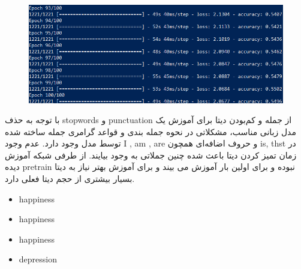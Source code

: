 \documentclass[10pt]{article}
\begin{document}
	\begin{figure}[ht!]
		\centering\includegraphics[width=0.9\linewidth]{../reports/lm_hap.png}
		\caption{
			}
		\label{lm_hap}
	\end{figure}

با توجه به حذف stopwords و punctuation از جمله و کم‌بودن دیتا برای آموزش یک مدل زبانی مناسب، مشکلاتی در نحوه جمله بندی و قواعد گرامری جمله ساخته شده توسط مدل وجود دارد. عدم وجود I , am , are و حروف اضافه‌ای همچون is, thst در زمان تمیز کردن دیتا باعث شده چنین جملاتی به وجود بیایند. از طرفی شبکه آموزش دیده pretrain نبوده و برای اولین بار آموزش می بیند و برای آموزش بهتر نیاز به دیتا بسیار بیشتری از حجم دیتا فعلی دارد.

\begin{itemize}
	\item happiness
	
	
	\item happiness
	 
	
	\item happiness
	
	
	\item depression
	
\end{itemize}

	
\newpage
\section{
}
\end{document}
